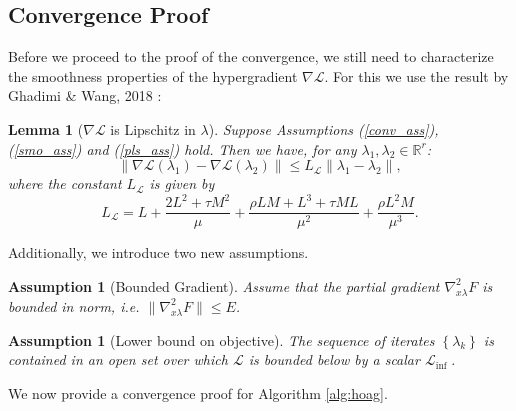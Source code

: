 \documentclass[11pt, twoside]{report}
\newtheorem{assumption}[theorem]{Assumption}
\newtheorem{lemma}[theorem]{Lemma}
\begin{document}
\subsection{Convergence Proof}
Before we proceed to the proof of the convergence, we still need to characterize the smoothness properties of the hypergradient $\nabla \mathcal{L}.$ For this we use the result by Ghadimi \& Wang, 2018 \cite{ghadimi2018approximation}:
\begin{lemma}[$\nabla \mathcal{L}$ is Lipschitz in $\lambda$] \label{nab_lip}
Suppose Assumptions (\ref{conv_ass}), (\ref{smo_ass}) and (\ref{pls_ass}) hold. Then we have, for any $\lambda_1, \lambda_2 \in \mathbb{R}^r$:
\[\|\nabla \mathcal{L}(\lambda_1) - \nabla \mathcal{L}(\lambda_2)\| \leq L_{\mathcal{L}} \|\lambda_1 - \lambda_2\|,\]
where the constant $L_{\mathcal{L}}$ is given by
\[L_{\mathcal{L}} = L + \frac{2L^2 + \tau M^2}{\mu} + \frac{\rho L M + L^3 + \tau M L}{\mu^2} + \frac{\rho L^2 M}{\mu^3}.\]
\end{lemma}
Additionally, we introduce two new assumptions.
\begin{assumption}[Bounded Gradient] \label{nablaFxl_bnd}
    Assume that the partial gradient $\nabla_{x\lambda}^2 F$ is bounded in norm, i.e. $\|\nabla_{x\lambda}^2 F\| \leq E$.
\end{assumption}

\begin{assumption}[Lower bound on objective] \label{inf_ass}
    The sequence of iterates $\left\{\lambda_k\right\}$ is contained in an open set over which $\mathcal{L}$ is bounded below by a scalar $\mathcal{L}_{\text {inf }}$.
\end{assumption}

We now provide a convergence proof for Algorithm \ref{alg:hoag}.
\end{document}
